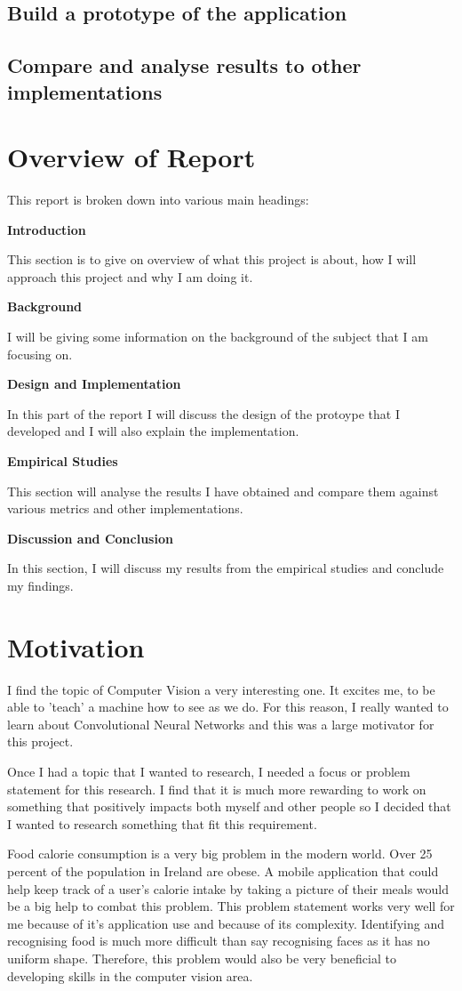 \subsection{Build a prototype of the application}

\subsection{Compare and analyse results to other implementations}


\section{Overview of Report}

This report is broken down into various main headings:

\textbf{Introduction}

This section is to give on overview of what this project is about, how I will approach this project and why I am doing it.

\textbf{Background}

I will be giving some information on the background of the subject that I am focusing on.

\textbf{Design and Implementation}

In this part of the report I will discuss the design of the protoype that I developed and I will also explain the implementation.

\textbf{Empirical Studies}

This section will analyse the results I have obtained and compare them against various metrics and other implementations.

\textbf{Discussion and Conclusion}

In this section, I will discuss my results from the empirical studies and conclude my findings.


\section{Motivation}
I find the topic of Computer Vision a very interesting one.
It excites me, to be able to 'teach' a machine how to see as we do.
For this reason, I really wanted to learn about Convolutional Neural Networks
and this was a large motivator for this project.

Once I had a topic that I wanted to research, I needed a focus or problem statement for this research.
I find that it is much more rewarding to work on something that positively impacts both myself and other people so I decided that I wanted to research something that fit this requirement.

Food calorie consumption is a very big problem in the modern world.
Over 25 percent of the population in Ireland are obese.
A mobile application that could help keep track of a user's calorie intake by taking a picture of their meals would be a big help to combat this problem.
This problem statement works very well for me because of it's application use and because of its complexity.
Identifying and recognising food is much more difficult than say recognising faces as it has no uniform shape.
Therefore, this problem would also be very beneficial to developing skills in the computer vision area.
